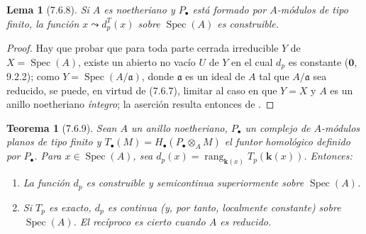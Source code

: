 \documentclass[10pt,oneside,openany]{book}
\theoremstyle{egaenv}\newtheorem*{env}{---}
\theoremstyle{egastatement}
\newtheorem*{theorem}{Teorema}
\newtheorem*{lemma}{Lema}
\theoremstyle{egadescription}
\begin{document}
\begin{lemma}[7.6.8]
\label{III.7.6.8}
Si $A$ es noetheriano y $P_\bullet$ está formado por $A$-módulos de
tipo finito, la función $x\leadsto d_p^T(x)$ sobre $\operatorname{Spec}(A)$ es construible.
\end{lemma}

\begin{proof}
Hay que probar que para toda parte cerrada irreducible $Y$ de $X=\operatorname{Spec}(A)$, existe un abierto no vacío $U$ de $Y$ en el cual $d_p$ es constante ($\mathbf{0}$, 9.2.2); como
$Y=\operatorname{Spec}(A/\mathfrak a)$, donde $\mathfrak a$ es un ideal de $A$ tal
que $A/\mathfrak a$ sea reducido, se puede, en virtud de (7.6.7), limitar al caso en que $Y=X$ y $A$ es un anillo noetheriano
\emph{íntegro}; la aserción resulta entonces de .
\end{proof}

\begin{theorem}[7.6.9]
\label{III.7.6.9}
Sean $A$ un anillo noetheriano, $P_\bullet$ un complejo de
$A$-módulos planos de tipo finito y
$T_\bullet(M)=H_\bullet(P_\bullet\otimes_A M)$
el funtor homológico definido por $P_\bullet$. Para
$x\in\operatorname{Spec}(A)$, sea $d_p(x)=\operatorname{rang}_{\mathbf{k}(x)}T_p(\boldsymbol{k}(x))$.
Entonces:
\begin{enumerate}
  \item[\textup{(i)}] La función $d_p$ es construible y semicontinua
    superiormente sobre $\operatorname{Spec}(A)$.
  \item[\textup{(ii)}] Si $T_p$ es exacto, $d_p$ es continua (y, por tanto,
    localmente constante) sobre $\operatorname{Spec}(A)$. El recíproco es cierto
    cuando $A$
    es reducido.
\end{enumerate}
\end{theorem}
\end{document}
